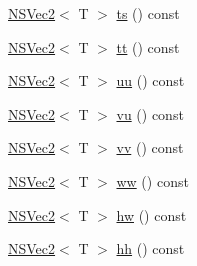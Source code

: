\begin{DoxyCompactItemize}
\hyperlink{structNSVec2}{N\-S\-Vec2}$<$ T $>$ \hyperlink{structNSVec2_a0fc62b7580d76e19f09f0d39bd168a15}{ts} () const 
\item 
\hyperlink{structNSVec2}{N\-S\-Vec2}$<$ T $>$ \hyperlink{structNSVec2_ab441b9e025841ee9dd192643084a5394}{tt} () const 
\item 
\hyperlink{structNSVec2}{N\-S\-Vec2}$<$ T $>$ \hyperlink{structNSVec2_a5d477996849201788ccbcf1084d5407d}{uu} () const 
\item 
\hyperlink{structNSVec2}{N\-S\-Vec2}$<$ T $>$ \hyperlink{structNSVec2_a704f14fafc40168630df50eaec31e0fe}{vu} () const 
\item 
\hyperlink{structNSVec2}{N\-S\-Vec2}$<$ T $>$ \hyperlink{structNSVec2_a29bd042b819fa7e0bebc42a2a3d052d9}{vv} () const 
\item 
\hyperlink{structNSVec2}{N\-S\-Vec2}$<$ T $>$ \hyperlink{structNSVec2_a597f5f381a180f554f041c0def96bdcb}{ww} () const 
\item 
\hyperlink{structNSVec2}{N\-S\-Vec2}$<$ T $>$ \hyperlink{structNSVec2_afb2d2c8bf0d898b58a366ec718ee4d9d}{hw} () const 
\item 
\hyperlink{structNSVec2}{N\-S\-Vec2}$<$ T $>$ \hyperlink{structNSVec2_a7b7525c03b309cd083e43d24b80a5467}{hh} () const 
\end{DoxyCompactItemize}
